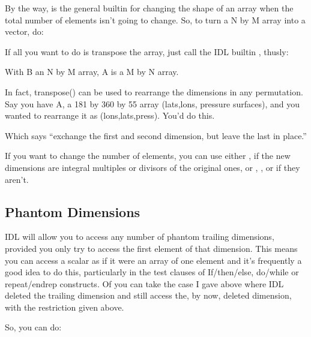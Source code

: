  By the way,  is the general builtin for changing the
  shape of an array when the total number of elements isn't going to
  change. So, to turn a N by M array into a vector, do:
  

  If all you want to do is transpose the array, just call the IDL
  builtin , thusly:


  With B an N by M array, A is a M by N array.

  In fact, transpose() can be used to rearrange the dimensions in any
  permutation. Say you have A, a 181 by 360 by 55 array (lats,lons,
  pressure surfaces), and you wanted to rearrange it as
  (lons,lats,press). You'd do this.


  Which says ``exchange the first and second dimension, but leave the
  last in place.''

  If you want to change the number of elements, you can use either
  , if the new dimensions are integral multiples or divisors
  of the original ones, or ,
  , or  if they aren't.
    
   



\subsection{Phantom Dimensions}\label{Phantom-Dimensions}

  IDL will allow you to access any number of phantom trailing
  dimensions, provided you only try to access the first element of
  that dimension. This means you can access a scalar as if it were an
  array of one element and it's frequently a good idea to do this,
  particularly in the test clauses of If/then/else, do/while or
  repeat/endrep constructs. Of you can take the case I gave above where
  IDL deleted the trailing dimension and still access the, by now,
  deleted dimension, with the restriction given above.

  So, you can do:


